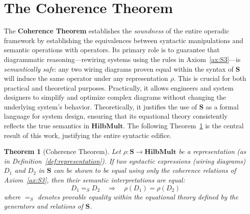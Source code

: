 \documentclass[11pt]{article}
\newtheorem{theorem}{Theorem}
\begin{document}
\section{The Coherence Theorem}\label{sec:The Coherence Theorem}

The \textbf{Coherence Theorem} establishes the \textit{soundness} of the entire operadic framework by establishing the equivalences between syntactic manipulations and semantic operations with operators. Its primary role is to guarantee that diagrammatic reasoning—rewiring systems using the rules in Axiom~\ref{ax:S3}—is \textit{semantically safe}: any two wiring diagrams proven equal within the syntax of $\mathbf{S}$ will induce  the same operator under any representation $\rho$. This is crucial for both practical and theoretical purposes. Practically, it allows engineers and system designers to simplify and optimize complex diagrams without changing the underlying system's behavior. Theoretically, it justifies the use of $\mathbf{S}$ as a formal language for system design, ensuring that its equational theory consistently reflects the true semantics in $\mathbf{HilbMult}$. The following Theorem~\ref{thm:coherence} is the central result of this work, justifying the entire syntactic edifice.

\begin{theorem}[Coherence Theorem]\label{thm:coherence}
%
Let $\rho: \mathbf{S} \to \mathbf{HilbMult}$ be a representation (as in Definition~\ref{def:representation}). If two syntactic expressions (wiring diagrams) $D_1$ and $D_2$ in $\mathbf{S}$ can be shown to be equal using only the coherence relations of Axiom~\ref{ax:S3}, then their semantic interpretations are equal:
\[
D_1 =_{S} D_2 \quad \Rightarrow \quad \rho(D_1) = \rho(D_2)
\]
where $=_{S}$ denotes provable equality within the equational theory defined by the generators and relations of $\mathbf{S}$.
%
\end{theorem}
\end{document}
